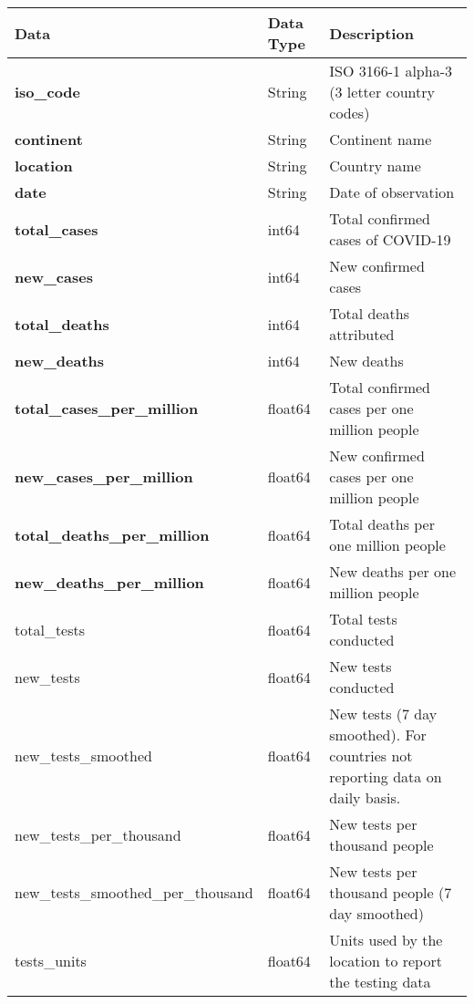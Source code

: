\documentclass[10pt]{article}
\begin{document}
\begin{table}[htbp]
    \centering
	\begin{tabular}{|l|l|p{8cm}|}
		\hline
		\textbf{Data} & \textbf{Data Type} & \textbf{Description} \\
        \hline \hline
        \textbf{iso\_code} & String & ISO 3166-1 alpha-3 (3 letter country codes) \\
        \hline
        \textbf{continent} & String & Continent name \\
        \hline
        \textbf{location} & String & Country name \\
        \hline
        \textbf{date} & String & Date of observation \\
        \hline
        \textbf{total\_cases} & int64 & Total confirmed cases of COVID-19 \\
        \hline
        \textbf{new\_cases} & int64 & New confirmed cases  \\
        \hline
        \textbf{total\_deaths} & int64 & Total deaths attributed \\
        \hline
        \textbf{new\_deaths} & int64 & New deaths \\
        \hline
        \textbf{total\_cases\_per\_million} & float64 & Total confirmed cases per one million people \\
        \hline
        \textbf{new\_cases\_per\_million} & float64 & New confirmed cases per one million people  \\
        \hline
        \textbf{total\_deaths\_per\_million} & float64 & Total deaths per one million people \\
        \hline
        \textbf{new\_deaths\_per\_million} & float64 & New deaths per one million people \\
        \hline
        total\_tests & float64 & Total tests conducted \\
        \hline
        new\_tests & float64 & New tests conducted \\
        \hline
        new\_tests\_smoothed & float64 & New tests (7 day smoothed). For countries not reporting data on daily basis. \\
        \hline
        new\_tests\_per\_thousand & float64 & New tests per thousand people \\
        \hline
        new\_tests\_smoothed\_per\_thousand & float64 & New tests per thousand people (7 day smoothed) \\
        \hline
        tests\_units & float64 & Units used by the location to report the testing data \\

\end{tabular}
\end{table}
\end{document}
